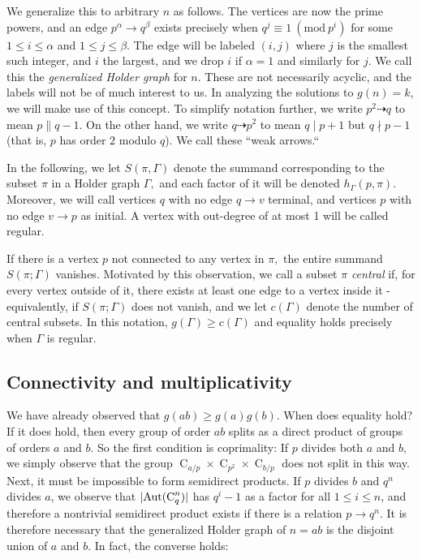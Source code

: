 \documentclass[draft]{article}
\DeclarePairedDelimiter\abs{\lvert}{\rvert}
\newcommand{\aut}[1]{\operatorname{Aut}(#1)}
\newcommand{\cyc}[1]{\operatorname{C}_{#1}}
\newcommand{\Mod}[1]{\ (\mathrm{mod} \ #1)}
\theoremstyle{plain}
\theoremstyle{definition}
\begin{document}
We generalize this to arbitrary $n$ as follows. The vertices are now the prime powers, and an edge $p^\alpha \rightarrow q^\beta$ exists precisely when $q^j \equiv 1 \Mod{p^i}$ for some $1 \le i \le \alpha$ and $1 \le j \le \beta$. The edge will be labeled $(i, j)$ where $j$ is the smallest such integer, and $i$ the largest, and we drop $i$ if $\alpha = 1$ and similarly for $j$. We call this the \emph{generalized Holder graph} for $n.$ These are not necessarily acyclic, and the labels will not be of much interest to us. In analyzing the solutions to $g(n) = k$, we will make use of this concept. To simplify notation further, we write $p^2 \dashrightarrow q$ to mean $p \parallel q - 1$. On the other hand, we write $q \dashrightarrow p^2$ to mean $q \mid p + 1$ but $q \nmid p - 1$ (that is, $p$ has order $2$ modulo $q$). We call these ``weak arrows.``

In the following, we let $S(\pi, \Gamma)$ denote the summand corresponding to the subset $\pi$ in a Holder graph $\Gamma,$ and each factor of it will be denoted $h_\Gamma(p, \pi).$ Moreover, we will call vertices $q$ with no edge $q \rightarrow v$ terminal, and vertices $p$ with no edge $v \rightarrow p$ as initial. A vertex with out-degree of at most 1 will be called regular.

If there is a vertex $p$ not connected to any vertex in $\pi,$ the entire summand $S(\pi; \Gamma)$ vanishes. Motivated by this observation, we call a subset $\pi$ \emph{central} if, for every vertex outside of it, there exists at least one edge to a vertex inside it - equivalently, if $S(\pi; \Gamma)$ does not vanish, and we let $c(\Gamma)$ denote the number of central subsets. In this notation, $g(\Gamma) \ge c(\Gamma)$ and equality holds precisely when $\Gamma$ is regular.

\subsection{Connectivity and multiplicativity}
We have already observed that $g(ab) \ge g(a)g(b).$ When does equality hold? If it does hold, then every group of order $ab$ splits as a direct product of groups of orders $a$ and $b.$ So the first condition is coprimality: If $p$ divides both $a$ and $b,$ we simply observe that the group $\cyc{a/p} \times \cyc{p^2} \times \cyc{b/p}$ does not split in this way. Next, it must be impossible to form semidirect products. If $p$ divides $b$ and $q^n$ divides $a$, we observe that $\abs{\aut{\cyc{q}^n}}$ has $q^i - 1$ as a factor for all $1 \le i \le n$, and therefore a nontrivial semidirect product exists if there is a relation $p \rightarrow q^n.$ It is therefore necessary that the generalized Holder graph of $n = ab$ is the disjoint union of $a$ and $b$. In fact, the converse holds:
\end{document}
